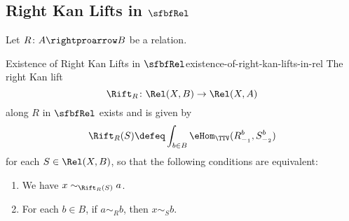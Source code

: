 \subsection{Right Kan Lifts in $\sfbfRel$}\label{subsection-right-kan-lifts-in-rel}
Let $R\colon A\rightproarrow B$ be a relation.
\begin{proposition}{Existence of Right Kan Lifts in $\sfbfRel$}{existence-of-right-kan-lifts-in-rel}%
    The right Kan lift
    \[
        \Rift_{R}%
        \colon%
        \Rel(X,B)%
        \to%
        \Rel(X,A)%
    \]%
    along $R$ in $\sfbfRel$ exists and is given by
    \[
        \Rift_{R}(S)%
        \defeq%
        \int_{b\in B}\eHom_{\TTV}(R^{b}_{-_{1}},S^{b}_{-_{2}})
    \]%
    for each $S\in\Rel(X,B)$, so that the following conditions are equivalent:
    \begin{enumerate}
        \item\label{existence-of-right-kan-lifts-in-rel-1}We have $x\sim_{\Rift_{R}(S)}a$.
        \item\label{existence-of-right-kan-lifts-in-rel-2}For each $b\in B$, if $a\sim_{R}b$, then $x\sim_{S}b$.
    \end{enumerate}
\end{proposition}
